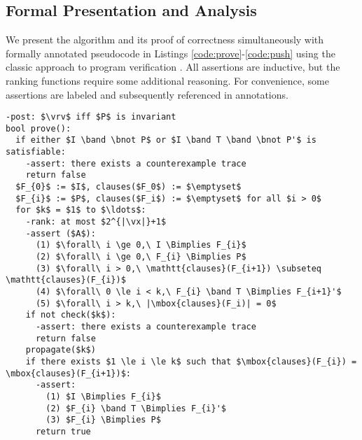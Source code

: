 \documentclass{llncs}
\newcommand{\band}{\wedge}
\newcommand{\bnot}{\neg}
\newcommand{\Bimplies}{\Rightarrow}
\begin{document}
\subsection{Formal Presentation and Analysis}
\label{subsec:formal}

We present the algorithm and its proof of correctness simultaneously
with formally annotated pseudocode in Listings
\ref{code:prove}-\ref{code:push} using the classic approach to program
verification \cite{Floyd:Verification:1967,Hoare:Verification:1969}.
All assertions are inductive, but the ranking functions require some
additional reasoning.  For convenience, some assertions are labeled
and subsequently referenced in annotations.

\newcommand{\vmin}{\mathit{min}}
\newcommand{\vrv}{\mathit{rv}}
\newcommand{\vstates}{\mathit{states}}
\begin{lstlisting}[name=code,caption={The main function},label=code:prove,float=tb]
-post: $\vrv$ iff $P$ is invariant
bool prove():
  if either $I \band \bnot P$ or $I \band T \band \bnot P'$ is satisfiable:
    -assert: there exists a counterexample trace
    return false
  $F_{0}$ := $I$, clauses($F_0$) := $\emptyset$
  $F_{i}$ := $P$, clauses($F_i$) := $\emptyset$ for all $i > 0$
  for $k$ = $1$ to $\ldots$:
    -rank: at most $2^{|\vx|}+1$
    -assert ($A$): 
      (1) $\forall\ i \ge 0,\ I \Bimplies F_{i}$
      (2) $\forall\ i \ge 0,\ F_{i} \Bimplies P$
      (3) $\forall\ i > 0,\ \mathtt{clauses}(F_{i+1}) \subseteq \mathtt{clauses}(F_{i})$
      (4) $\forall\ 0 \le i < k,\ F_{i} \band T \Bimplies F_{i+1}'$
      (5) $\forall\ i > k,\ |\mbox{clauses}(F_i)| = 0$
    if not check($k$):
      -assert: there exists a counterexample trace
      return false
    propagate($k$)
    if there exists $1 \le i \le k$ such that $\mbox{clauses}(F_{i}) = \mbox{clauses}(F_{i+1})$:
      -assert:
        (1) $I \Bimplies F_{i}$
        (2) $F_{i} \band T \Bimplies F_{i}'$
        (3) $F_{i} \Bimplies P$
      return true
\end{lstlisting}
\end{document}
